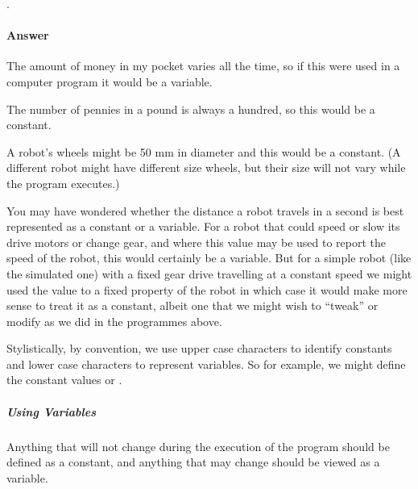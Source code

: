 \documentclass[letterpaper,10pt,english]{sphinxmanual}
\begin{document}



.


\paragraph{Answer}
\label{\detokenize{content/01_Robot_Lab/Section_00_02:id2}}

The amount of money in my pocket varies all the time, so if this were used in a computer program it would be a variable.

The number of pennies in a pound is always a hundred, so this would be a constant.

A robot’s wheels might be 50 mm in diameter and this would be a constant. (A different robot might have different size wheels, but their size will not vary while the program executes.)

You may have wondered whether the distance a robot travels in a second is best represented as a constant or a variable. For a robot that could speed or slow its drive motors or change gear, and where this value may be used to report the speed of the robot, this would certainly be a variable. But for a simple robot (like the simulated one) with a fixed gear drive travelling at a constant speed we might used the value to  a fixed property of the robot in which case it would make more sense
to treat it as a constant, albeit one that we might wish to “tweak” or modify as we did in the programmes above.

Stylistically, by convention, we use upper case characters to identify constants and lower case characters to represent variables. So for example, we might define the constant values  or .


\subparagraph{Using Variables}
\label{\detokenize{content/01_Robot_Lab/Section_00_02:Using-Variables}}
Anything that will not change during the execution of the program should be defined as a constant, and anything that may change should be viewed as a variable.
\end{document}
